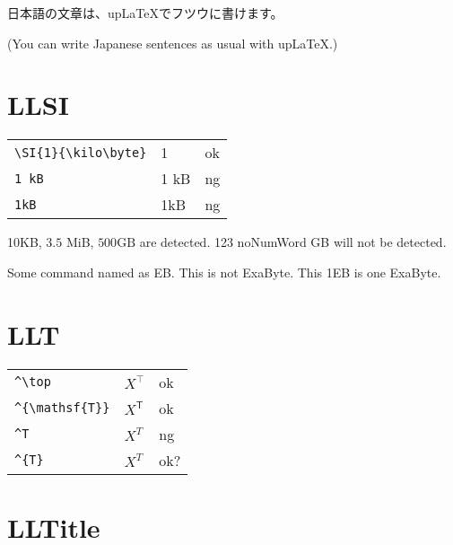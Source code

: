 \documentclass[a4paper]{article}
\newcommand{\tA}[1]{\textcolor{cA}{#1}}
\newcommand{\tC}[1]{\textcolor{cC}{#1}}
\newcommand{\tD}[1]{\textcolor{cD}{#1}}
\begin{document}
\vspace{\baselineskip}

\begin{CJK}{UTF8}{ipxm}日本語の文章は、upLaTeXでフツウに書けます。\end{CJK}

(You can write Japanese sentences as usual with upLaTeX.)

\section{LLSI}

\begin{table}[H]
	\centering
	\begin{tabular}{lll}
		\verb|\SI{1}{\kilo\byte}| & \SI{1}{\kilo\byte} & \tA{ok} \\
		\verb|1 kB|               & 1 kB               & \tD{ng} \\
		\verb|1kB|                & 1kB                & \tD{ng} \\
	\end{tabular}
\end{table}

\newcommand{\EB}{Some command named as EB}

10KB, $3.5$ MiB, $500\mathrm{GB}$ are detected. 123 noNumWord GB will not be detected.

\EB. This is not ExaByte. This 1EB is one ExaByte.

\section{LLT}

\begin{table}[H]
	\centering
	\begin{tabular}{lll}
		\verb|^\top|         & $X^\top$         & \tA{ok}  \\
		\verb|^{\mathsf{T}}| & $X^{\mathsf{T}}$ & \tA{ok}  \\
		\verb|^T|            & $X^T$            & \tD{ng}  \\
		\verb|^{T}|          & $X^{T}$          & \tC{ok?} \\
	\end{tabular}
\end{table}

\section{LLTitle}
\end{document}
